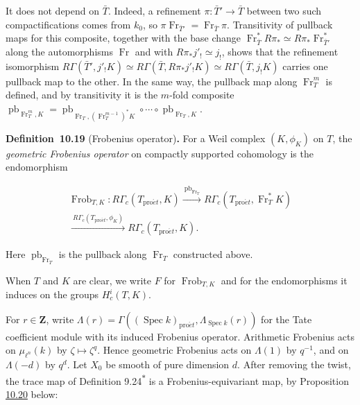 \documentclass[11pt]{article}
\newenvironment{bpstatement}[2]{\par\addvspace{0.6\baselineskip}\noindent\textbf{#1}#2\textbf{.}\enspace\ignorespaces}
  {\par\addvspace{0.4\baselineskip}}
\newcommand{\bpout}[1]{#1\textsuperscript{\hyperlink{bp-outside}{\ensuremath{\ast}}}}
\begin{document}
It does not depend on \(\bar T\). Indeed, a refinement \(\pi:\bar T'\to\bar T\) between two such compactifications comes from \(k_0\), so \(\pi\operatorname{Fr}_{\bar T'}=\operatorname{Fr}_{\bar T}\pi\). Transitivity of pullback maps for this composite, together with the base change \(\operatorname{Fr}_{\bar T}^*R\pi_*\simeq R\pi_*\operatorname{Fr}_{\bar T'}^*\) along the automorphisms \(\operatorname{Fr}\) and with \(R\pi_*j'_!\simeq j_!\), shows that the refinement isomorphism \(R\Gamma(\bar T',j'_!K)\simeq R\Gamma(\bar T,R\pi_*j'_!K)
\simeq R\Gamma(\bar T,j_!K)\) carries one pullback map to the other. In the same way, the pullback map along \(\operatorname{Fr}_T^m\) is defined, and by transitivity it is the \(m\)-fold composite \(\operatorname{pb}_{\operatorname{Fr}_T^m,K}=\operatorname{pb}_{\operatorname{Fr}_T,(\operatorname{Fr}_T^{m-1})^*K}\circ\cdots\circ\operatorname{pb}_{\operatorname{Fr}_T,K}\).

\label{bp58}%
\begin{bpstatement}{Definition~10.19}{ (Frobenius operator)}
For a Weil complex \((K,\phi_K)\) on \(T\), the \emph{geometric Frobenius operator} on compactly supported cohomology is the endomorphism

\[
\begin{gathered}
\operatorname{Frob}_{T,K}:R\Gamma_c(T_{\mathrm{pro}\acute{e}t},K)
\xrightarrow{\ \operatorname{pb}_{\operatorname{Fr}_T}\ }
R\Gamma_c(T_{\mathrm{pro}\acute{e}t},\operatorname{Fr}_T^*K)\\
\xrightarrow{\ R\Gamma_c(T_{\mathrm{pro}\acute{e}t},\phi_K)\ }
R\Gamma_c(T_{\mathrm{pro}\acute{e}t},K).
\end{gathered}
\]

Here \(\operatorname{pb}_{\operatorname{Fr}_T}\) is the pullback along \(\operatorname{Fr}_T\) constructed above.
\end{bpstatement}

\label{bp59}%
When \(T\) and \(K\) are clear, we write \(F\) for \(\operatorname{Frob}_{T,K}\) and for the endomorphisms it induces on the groups \(H^i_c(T,K)\).

For \(r\in\mathbf Z\), write \(\Lambda(r)=\Gamma((\operatorname{Spec}k)_{\mathrm{pro}\acute{e}t},
\Lambda_{\operatorname{Spec}k}(r))\) for the Tate coefficient module with its induced Frobenius operator. Arithmetic Frobenius acts on \(\mu_{\ell^n}(k)\) by \(\zeta\mapsto\zeta^q\). Hence geometric Frobenius acts on \(\Lambda(1)\) by \(q^{-1}\), and on \(\Lambda(-d)\) by \(q^d\). Let \(X_0\) be smooth of pure dimension \(d\). After removing the twist, the trace map of Definition \bpout{9.24} is a Frobenius-equivariant map, by Proposition \hyperref[bp62]{10.20} below:
\end{document}
